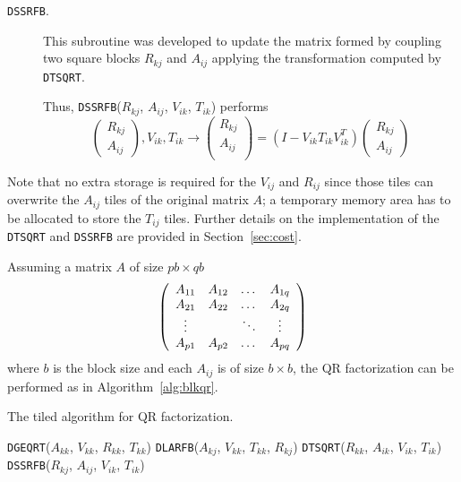 \documentclass{article}
\begin{document}
\begin{description}
\item[\texttt{DSSRFB}.] This subroutine was developed to update the
  matrix formed by coupling two square blocks $R_{kj}$ and $A_{ij}$ applying the
  transformation computed by \texttt{DTSQRT}. 

  Thus, \texttt{DSSRFB}($R_{kj}$, $A_{ij}$, $V_{ik}$, $T_{ik}$)
  performs
  \begin{displaymath}
    \left(\begin{array}{c}
      R_{kj}\\
      A_{ij}
    \end{array}\right), V_{ik}, T_{ik} \longrightarrow
    \left(
    \begin{array}{c}
      R_{kj}\\
      A_{ij}\\
    \end{array}\right)=
    (I - V_{ik}T_{ik} V^T_{ik})\left(\begin{array}{c}
      R_{kj}\\
      A_{ij}
    \end{array}\right)
  \end{displaymath}
  
  
  
\end{description}

Note that no extra storage is required for the $V_{ij}$ and $R_{ij}$
since those tiles can overwrite the $A_{ij}$ tiles of the original
matrix $A$; a temporary memory area has to be allocated to store the
$T_{ij}$ tiles. Further details on the implementation of the \texttt{DTSQRT}
and \texttt{DSSRFB} are provided in Section~\ref{sec:cost}.

Assuming a matrix $A$ of size $pb \times qb$
\begin{displaymath}
  \left(\begin{array}[!h]{cccc}
    A_{11}  & A_{12} & \dots  & A_{1q}  \\
    A_{21}  & A_{22} & \dots  & A_{2q}  \\
    \vdots &       & \ddots & \vdots \\
    A_{p1}  & A_{p2} & \dots  & A_{pq}
  \end{array}\right)
\end{displaymath}
where $b$ is the block size and each $A_{ij}$ is of size $b \times b$,
the QR factorization can be performed as in Algorithm~\ref{alg:blkqr}.

\begin{algorithm}[!h]
\caption{\label{alg:blkqr}The tiled algorithm for QR factorization.}
  \begin{algorithmic}[1]
    \STATE \texttt{DGEQRT}($A_{kk}$, $V_{kk}$, $R_{kk}$, $T_{kk}$)
    \STATE \texttt{DLARFB}($A_{kj}$, $V_{kk}$, $T_{kk}$, $R_{kj}$)
    \ENDFOR
    \STATE \texttt{DTSQRT}($R_{kk}$, $A_{ik}$, $V_{ik}$, $T_{ik}$)
    \STATE \texttt{DSSRFB}($R_{kj}$, $A_{ij}$, $V_{ik}$, $T_{ik}$)
    \ENDFOR
    \ENDFOR
    \ENDFOR
  \end{algorithmic}
\end{algorithm}
\end{document}
